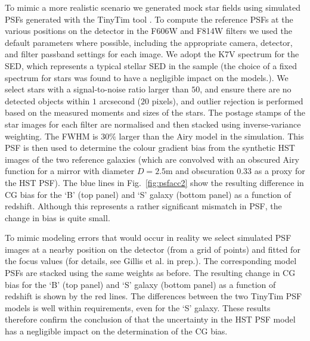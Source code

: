 \documentclass[useAMS,usenatbib]{mnras}
\begin{document}
To mimic a more realistic scenario we generated mock star fields using simulated PSFs generated with
the {\sc TinyTim} tool \citep{2011SPIE.8127E..0JK}. To compute the reference PSFs at the various positions on the detector in the F606W and F814W filters we used the default parameters where possible, including the appropriate camera, detector, and filter passband settings for each image. We adopt the K7V spectrum for the SED, which represents a typical stellar SED in the sample (the choice of a fixed spectrum for stars was found to have a negligible impact on the models.). We select stars with a signal-to-noise ratio larger than $50$, and ensure there are no detected objects within $1$ arcsecond ($20$ pixels), and outlier rejection is performed based on the measured moments and sizes of the stars. The postage stamps of the star images for each filter are normalised and then stacked using inverse-variance weighting. The FWHM is $30\%$ larger than the Airy model in the simulation. This PSF is then used to determine the colour gradient bias from the synthetic HST images of the two reference galaxies (which are convolved with an obscured Airy function for a mirror with diameter $D = 2.5$m and obscuration 0.33 as a proxy for the HST PSF). The blue lines in Fig.~\ref{fig:psfacc2} show the resulting difference in CG bias for the `B' (top panel) and `S' galaxy (bottom panel) as a function of redshift. Although this represents a rather significant mismatch in PSF, the change in bias is quite small.

To mimic modeling errors that would occur in reality we select simulated PSF images at a nearby position on the detector (from a grid of points) and fitted for the focus values (for details, see Gillis et al. in prep.). The corresponding model PSFs are stacked using the same weights as before. The resulting change in CG bias for the `B' (top panel) and `S' galaxy (bottom panel) as a function of redshift is shown by the red lines. The differences between the two {\sc TinyTim} PSF models is well within requirements, even for the `S' galaxy. These results therefore confirm the conclusion of   that the uncertainty in the HST PSF model has a negligible impact on the determination of the CG bias.
\end{document}
